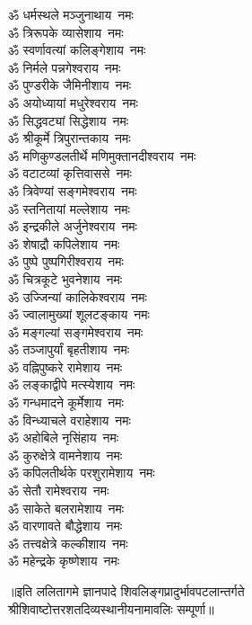 \begin{multicols}{2}
\begin{flushleft}
ॐ धर्मस्थले मञ्जुनाथाय~नमः\\
ॐ त्रिरूपके व्यासेशाय~नमः\hfill{}\\
ॐ स्वर्णावत्यां कलिङ्गेशाय~नमः\\
ॐ निर्मले पन्नगेश्वराय~नमः\\
ॐ पुण्डरीके जैमिनीशाय~नमः\\
ॐ अयोध्यायां मधुरेश्वराय~नमः\\
ॐ सिद्धवट्यां सिद्धेशाय~नमः\\
ॐ श्रीकूर्मे त्रिपुरान्तकाय~नमः\\
ॐ मणिकुण्डलतीर्थे मणिमुक्तानदीश्वराय~नमः\\
ॐ वटाटव्यां कृत्तिवाससे~नमः\\
ॐ त्रिवेण्यां सङ्गमेश्वराय~नमः\\
ॐ स्तनितायां मल्लेशाय~नमः\hfill{}\\
ॐ इन्द्रकीले अर्जुनेश्वराय~नमः\\
ॐ शेषाद्रौ कपिलेशाय~नमः\\
ॐ पुष्पे पुष्पगिरीश्वराय~नमः\\
ॐ चित्रकूटे भुवनेशाय~नमः\\
ॐ उज्जिन्यां कालिकेश्वराय~नमः\\
ॐ ज्वालामुख्यां शूलटङ्काय~नमः\\
ॐ मङ्गल्यां सङ्गमेश्वराय~नमः\\
ॐ तञ्जापुर्यां बृहतीशाय~नमः\\
ॐ वह्निपुष्करे रामेशाय~नमः\\
ॐ लङ्काद्वीपे मत्स्येशाय~नमः\hfill{}\\
ॐ गन्धमादने कूर्मेशाय~नमः\\
ॐ विन्ध्याचले वराहेशाय~नमः\\
ॐ अहोबिले नृसिंहाय~नमः\\
ॐ कुरुक्षेत्रे वामनेशाय~नमः\\
ॐ कपिलतीर्थके परशुरामेशाय~नमः\\
ॐ सेतौ रामेश्वराय~नमः\\
ॐ साकेते बलरामेशाय~नमः\\
ॐ वारणावते बौद्धेशाय~नमः\\
ॐ तत्त्वक्षेत्रे कल्कीशाय~नमः\\
ॐ महेन्द्रके कृष्णेशाय~नमः\hfill{}\\
\end{flushleft}
\end{multicols}

॥इति ललितागमे ज्ञानपादे शिवलिङ्गप्रादुर्भावपटलान्तर्गते\\
 श्रीशिवाष्टोत्तरशतदिव्यस्थानीयनामावलिः सम्पूर्णा॥

